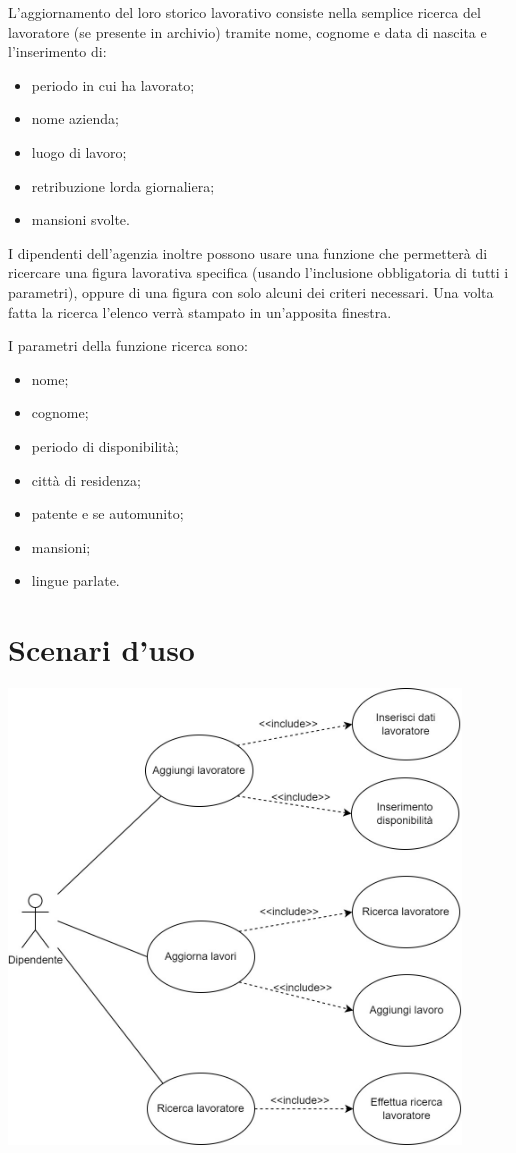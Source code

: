 \documentclass{article}
\begin{document}
    L'aggiornamento del loro storico lavorativo consiste nella semplice ricerca del lavoratore (se presente in archivio) tramite nome, cognome e data di nascita e l'inserimento di:

    \begin{itemize}
        \item periodo in cui ha lavorato;
        \item nome azienda;
        \item luogo di lavoro;
        \item retribuzione lorda giornaliera;
        \item mansioni svolte.
    \end{itemize}

    I dipendenti dell'agenzia inoltre possono usare una funzione che permetterà di ricercare una figura lavorativa specifica (usando l'inclusione obbligatoria di tutti i parametri), oppure di una figura con solo alcuni dei criteri necessari. Una volta fatta la ricerca l'elenco verrà stampato in un'apposita finestra. 
    
    I parametri della funzione ricerca sono:

    \begin{itemize}
        \item nome;
        \item cognome;
        \item periodo di disponibilità;
        \item città di residenza;
        \item patente e se automunito;
        \item mansioni;
        \item lingue parlate.
    \end{itemize}

    \section{Scenari d'uso}

    \includegraphics[width=0.9\textwidth]{casi_uso.jpg}
\end{document}
